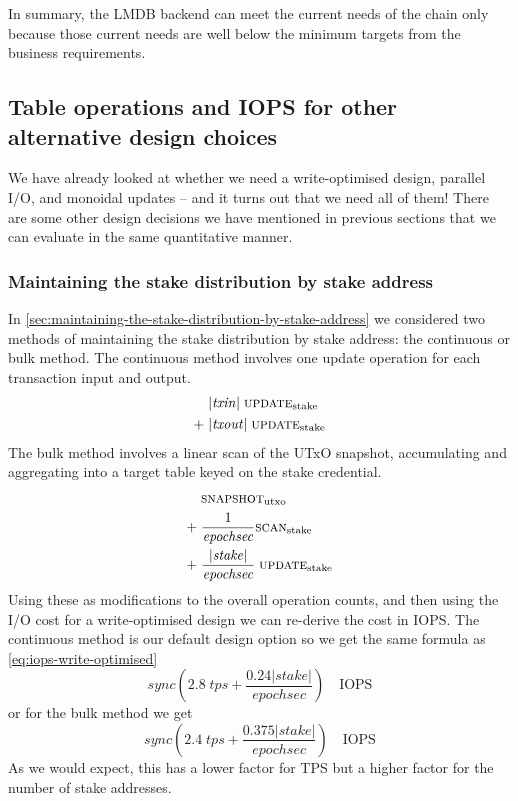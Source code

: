 \documentclass[11pt,a4paper]{article}
\begin{document}
In summary, the LMDB backend can meet the current needs of the chain only
because those current needs are well below the minimum targets from the
business requirements.

\subsection{Table operations and IOPS for other alternative design choices}

We have already looked at whether we need a write-optimised design, parallel
I/O, and monoidal updates -- and it turns out that we need all of them! There
are some other design decisions we have mentioned in previous sections that we
can evaluate in the same quantitative manner.

\subsubsection{Maintaining the stake distribution by stake address}

In \cref{sec:maintaining-the-stake-distribution-by-stake-address} we considered
two methods of maintaining the stake distribution by stake address: the
continuous or bulk method. The continuous method involves one {\sc update}
operation for each transaction input and output.
\begin{equation}
\begin{aligned}
      & |\mathit{txin}| \; \text{{\sc update}}_\text{stake} \\
 + \; & |\mathit{txout}| \; \text{{\sc update}}_\text{stake} \\
\end{aligned}
\end{equation}
The bulk method involves a linear scan of the UTxO snapshot, accumulating and
aggregating into a target table keyed on the stake credential.
\begin{equation}
\begin{aligned}
      & \text{{\sc snapshot}}_\text{utxo} \\
 + \; & \frac{1}{\mathit{epochsec}}\text{{\sc scan}}_\text{stake} \\
 + \; & \frac{|\mathit{stake}|}{\mathit{epochsec}} \; \text{{\sc update}}_\text{stake} \\
\end{aligned}
\end{equation}
Using these as modifications to the overall operation counts, and then using
the I/O cost for a write-optimised design we can re-derive the cost in IOPS.
The continuous method is our default design option so we get the same formula
as \cref{eq:iops-write-optimised}
\begin{equation*}
\mathit{sync} \left(
    2.8 \; \mathit{tps} + \frac{0.24 |stake|}{\mathit{epochsec}}
  \right)\quad\text{IOPS}
\end{equation*}
or for the bulk method we get
\begin{equation*}
\mathit{sync} \left(
    2.4 \; \mathit{tps} + \frac{0.375 |stake|}{\mathit{epochsec}}
  \right)\quad\text{IOPS}
\end{equation*}
As we would expect, this has a lower factor for TPS but a higher factor for
the number of stake addresses.
\end{document}
